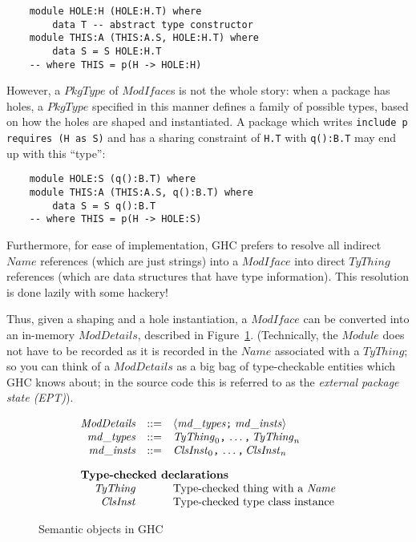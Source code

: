 \documentclass{article}
\newcommand{\I}[1]{\ensuremath{\mathit{#1}}}
\begin{document}
\begin{verbatim}
    module HOLE:H (HOLE:H.T) where
        data T -- abstract type constructor
    module THIS:A (THIS:A.S, HOLE:H.T) where
        data S = S HOLE:H.T
    -- where THIS = p(H -> HOLE:H)
\end{verbatim}
%
However, a \I{PkgType} of \I{ModIface}s is not the whole story:
when a package has holes, a \I{PkgType} specified in this manner
defines a family of possible types, based on how the holes are
shaped and instantiated.  A package which writes \verb|include p requires (H as S)|
and has a sharing constraint of \verb|H.T| with \verb|q():B.T| may
end up with this ``type'':

\begin{verbatim}
    module HOLE:S (q():B.T) where
    module THIS:A (THIS:A.S, q():B.T) where
        data S = S q():B.T
    -- where THIS = p(H -> HOLE:S)
\end{verbatim}
%
Furthermore, for ease of implementation, GHC prefers to resolve all
indirect \I{Name} references (which are just strings) into a
\I{ModIface} into direct \I{TyThing} references (which are data
structures that have type information).  This resolution is done lazily
with some hackery!

Thus, given a shaping and a hole instantiation, a \I{ModIface} can be
converted into an in-memory \I{ModDetails}, described in
Figure~\ref{fig:typecheck-more}.  (Technically, the \I{Module} does not
have to be recorded as it is recorded in the \I{Name} associated with a
\I{TyThing}; so you can think of a \I{ModDetails} as a big bag of type-checkable
entities which GHC knows about; in the source code this
is referred to as the \emph{external package state (EPT)}).

\begin{figure}[htpb]
$$
\begin{array}{rcll}
\I{ModDetails} & ::= & \langle\I{md\_types} \verb|;|\; \I{md\_insts}\rangle \\
\I{md\_types}  & ::= & \I{TyThing}_0 \verb|,|\, \ldots\verb|,|\, \I{TyThing}_n \\
\I{md\_insts}  & ::= & \I{ClsInst}_0 \verb|,|\, \ldots\verb|,|\, \I{ClsInst}_n \\[1em]
\multicolumn{3}{l}{\mbox{\bf Type-checked declarations}} \\
\I{TyThing}    &     & \mbox{Type-checked thing with a \I{Name}} \\
\I{ClsInst}    &     & \mbox{Type-checked type class instance} \\
\end{array}
$$
\caption{Semantic objects in GHC} \label{fig:typecheck-more}
\end{figure}
\end{document}
